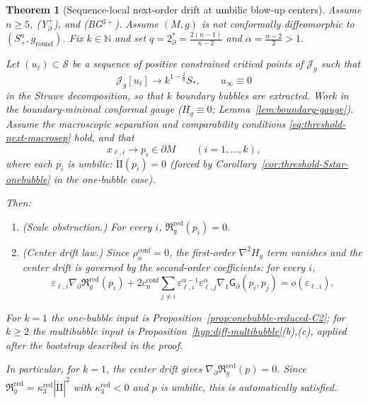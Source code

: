 \documentclass[11pt,reqno,a4paper]{amsart}
\numberwithin{equation}{section}
\theoremstyle{plain}
\newtheorem{theorem}{Theorem}[section]
\theoremstyle{remark}
\theoremstyle{plain}
\begin{document}
\begin{theorem}[Sequence-local next-order drift at umbilic blow-up centers]
\label{thm:threshold-next-local}
Assume $n\ge5$, \textup{(Y$^+_{\partial}$)}, and \textup{(BG$^{3+}$)}.
Assume $(M,g)$ is not conformally diffeomorphic to $(S^n_+,g_{\mathrm{round}})$.
Fix $k\in\mathbb N$ and set $q=2^*_\partial=\frac{2(n-1)}{n-2}$ and $\alpha=\frac{n-2}{2}>1$.

Let $(u_\ell)\subset\mathcal S$ be a sequence of positive constrained critical points of $\mathcal J_g$
such that
\[
\mathcal J_g[u_\ell]\to k^{1-\frac{2}{q}}S_\ast,\qquad u_\infty\equiv0
\]
in the Struwe decomposition, so that $k$ boundary bubbles are extracted.
Work in the boundary-minimal conformal gauge ($H_g\equiv0$; Lemma~\ref{lem:boundary-gauge}).
Assume the macroscopic separation and comparability conditions
\eqref{eq:threshold-next-macrosep} hold, and that
\[
x_{\ell,i}\to p_i\in\partial M\qquad(i=1,\dots,k),
\]
where each $p_i$ is umbilic: $\mathring{\mathrm{II}}(p_i)=0$
(forced by Corollary~\ref{cor:threshold-Sstar-onebubble} in the one-bubble case).

Then:
\begin{enumerate}[label=(\alph*),leftmargin=1.25em]
\item \emph{(Scale obstruction.)} For every $i$,
$\mathfrak R_g^{\mathrm{red}}(p_i)=0$.
\item \emph{(Center drift law.)} Since $\rho_n^{\mathrm{conf}}=0$, the first-order $\nabla^2 H_g$
term vanishes and the center drift is governed by the second-order coefficients:
for every $i$,
\begin{equation}\label{eq:center-drift}
\varepsilon_{\ell,i}\nabla_\partial\mathfrak R_g^{\mathrm{red}}(p_i)
+2c_n^{\mathrm{conf}}\sum_{j\neq i}
\varepsilon_{\ell,i}^{\alpha-1}\varepsilon_{\ell,j}^{\alpha}
\nabla_1\mathsf G_\partial(p_i,p_j)
=o(\varepsilon_{\ell,i}).
\end{equation}
\end{enumerate}
For $k=1$ the one-bubble input is Proposition~\ref{prop:onebubble-reduced-C2};
for $k\ge2$ the multibubble input is
Proposition~\ref{hyp:diff-multibubble}\textup{(b),(c)}, applied after the bootstrap described in the proof.

In particular, for $k=1$, the center drift gives $\nabla_\partial\mathfrak R_g^{\mathrm{red}}(p)=0$.
Since $\mathfrak R_g^{\mathrm{red}}=\kappa_3^{\mathrm{red}}|\mathring{\mathrm{II}}|^2$ with $\kappa_3^{\mathrm{red}}<0$
and $p$ is umbilic, this is automatically satisfied.
\end{theorem}
\end{document}
